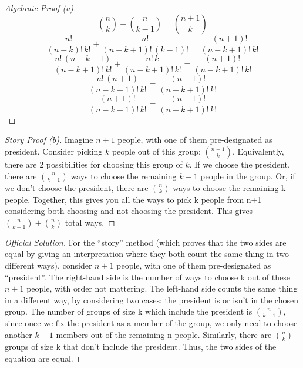 \documentclass[10pt]{article}
\begin{document}
\begin{proof}[Algebraic Proof (a)]

\[
\binom{n}{k} + \binom{n}{k-1} = \binom{n+1}{k}
\]
\[
\frac{n!}{(n - k)! \, k!} + \frac{n!}{(n - k + 1)! \, (k - 1)!} = \frac{(n + 1)!}{(n - k + 1)! \, k!}  
\]
\[
\frac{n! \, (n - k + 1)}{(n - k + 1)! \, k!} + \frac{n! \, k}{(n - k + 1)! \, k!} = \frac{(n + 1)!}{(n - k + 1)! \, k!}  
\]
\[
\frac{n! \, (n + 1)}{(n - k + 1)! \, k!} = \frac{(n + 1)!}{(n - k + 1)! \, k!}  
\]
\[
\frac{(n + 1)!}{(n - k + 1)! \, k!} = \frac{(n + 1)!}{(n - k + 1)! \, k!}  
\]
\end{proof}

\begin{proof}[Story Proof (b)]
Imagine $n + 1$ people, with one of them pre-designated as president. Consider picking $k$ people out of this group: \(\binom{n+1}{k}\). Equivalently, there are 2 possibilities for choosing this group of $k$. If we choose the president, there are \(\binom{n}{k-1}\) ways to choose the remaining $k - 1$ people in the group. Or, if we don't choose the president, there are \(\binom{n}{k}\) ways to choose the remaining k people. Together, this gives you all the ways to pick k people from n+1 considering both choosing and not choosing the president. This gives $\binom{n}{k-1} + \binom{n}{k}$ total ways.
\end{proof}

\begin{proof}[Official Solution]
For the “story” method (which proves that the two sides are equal by giving an interpretation where they both count the same thing in two different ways), consider $n + 1$ people, with one of them pre-designated as “president”. The right-hand side is the number of ways to choose k out of these $n + 1$ people, with order not mattering. The left-hand side counts the same thing in a different way, by considering two cases: the president is or isn’t in the chosen group. The number of groups of size k which include the president is \(\binom{n}{k-1}\), since once we fix the president as a member of the group, we only need to choose another $k-1$ members out of the remaining n people. Similarly, there are \(\binom{n}{k}\) groups of size k that don’t include the president. Thus, the two sides of the equation are equal.
\end{proof}
\end{document}
